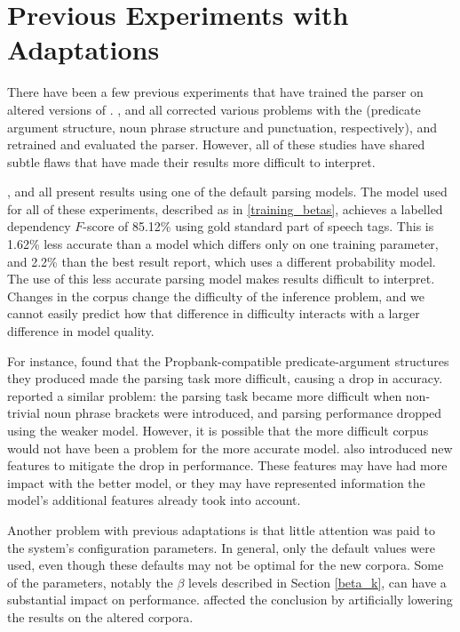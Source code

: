 \section{Previous Experiments with \ccgbank Adaptations}
\label{sec:previous_problems}

There have been a few previous experiments that have trained the \candc parser
on altered versions of \ccgbank. \citet{honnibal:pacling07prop},
\citet{vadas:08} and \citet{tse:08} all corrected various problems with the
\ccgbank (predicate argument structure, noun phrase structure and punctuation,
respectively), and retrained and evaluated the parser. However, all of these
studies have shared subtle flaws that have made their results more difficult to
interpret.

\citet{honnibal:pacling07prop}, \citet{vadas:08} and \citet{tse:08} all present
results using one of the default \candc parsing models.
The model used for all of these experiments, described as \derivsbad in
\ref{training_betas}, achieves a labelled dependency $F$-score of 85.12\%
using gold standard part of speech tags. This is 1.62\% less accurate than a
model which differs only on one training parameter, and 2.2\% than the best
result \citet{clark:cl07} report, which uses a different probability model.
The use of this less accurate
parsing model makes results difficult to interpret. Changes in the corpus change
the difficulty of the inference problem, and we cannot easily predict how that
difference in difficulty interacts with a larger difference in model quality.

For instance, \citet{honnibal:pacling07prop} found that the Propbank-compatible
predicate-argument structures they produced made the parsing task more
difficult, causing a drop in accuracy. \citet{vadas:08} reported a similar
problem: the parsing task became more difficult when non-trivial noun phrase
brackets were introduced, and parsing performance dropped using the weaker
model. However, it is possible that the more difficult corpus would not have
been a problem for the more accurate model. \citet{vadas:08} also introduced new
features to mitigate the drop in performance. These features may have had more
impact with the better model, or they may have represented information the
model's additional features already took into account.

Another problem with previous \ccgbank adaptations is that little attention was
paid to the system's configuration parameters. In general, only the default
values were used, even though these defaults may not be optimal for the new
corpora. Some of the parameters, notably the $\beta$ levels described in Section
\ref{beta_k}, can have a substantial impact on performance.
affected the conclusion by artificially lowering the results on the altered
corpora.

